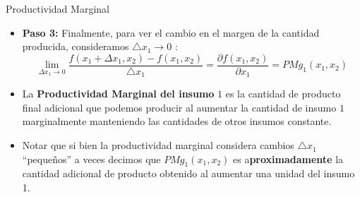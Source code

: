 \documentclass{beamer}
\theoremstyle{definition}
\begin{document}
\begin{frame}{Productividad Marginal}
\begin{itemize}
\item \textbf{Paso 3:} Finalmente, para ver el cambio en el margen de la cantidad producida, consideramos $\triangle x_{1} \rightarrow 0$ :
$$
\lim _{\Delta x_{1} \rightarrow 0} \frac{f\left(x_{1}+\Delta x_{1}, x_{2}\right)-f\left(x_{1}, x_{2}\right)}{\triangle x_{1}}=\frac{\partial f\left(x_{1}, x_{2}\right)}{\partial x_{1}}=P M g_{1}(x_1,x_2)
$$
\item La \textbf{Productividad Marginal del insumo} $1$ es la cantidad de producto final adicional que podemos producir al aumentar la cantidad de insumo $1$ marginalmente manteniendo las cantidades de otros insumos constante.
\item Notar que si bien la productividad marginal considera cambios $\triangle x_{1}$ ``pequeños'' a veces decimos que $PMg_{1}(x_1,x_2)$ es a\textbf{proximadamente} la cantidad adicional de producto obtenido al aumentar una unidad del insumo 1.
\end{itemize}
\end{frame}		
\end{document}
